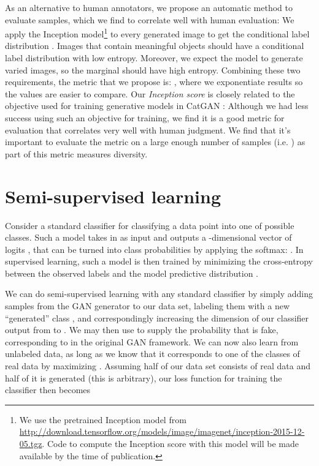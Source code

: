 \documentclass{article} \usepackage{nips14submit_e,times}
\begin{document}
As an alternative to human annotators, we propose an automatic method to evaluate samples, which we find to correlate well with human evaluation: We apply the Inception model\footnote{We use the pretrained Inception model from \url{http://download.tensorflow.org/models/image/imagenet/inception-2015-12-05.tgz}. Code to compute the Inception score with this model will be made available by the time of publication.} \cite{szegedy2015rethinking} to every generated image to get the conditional label distribution . Images that contain meaningful objects should have a conditional label distribution  with low entropy. Moreover, we expect the model to generate varied images, so the marginal  should have high entropy. Combining these two requirements, the metric that we propose is: , where we exponentiate results so the values are easier to compare.
Our {\em Inception score} is closely related to the objective used for training generative models in CatGAN \cite{springenberg2015unsupervised}: Although we had less success using such an objective for training, we find it is a good metric for evaluation that correlates very well with human judgment. We find that it's important to evaluate the metric on a large enough number of samples (i.e. ) as part of this metric measures diversity. 


\section{Semi-supervised learning}
\label{sec:feat_match_experiments}
Consider a standard classifier for classifying a data point  into one of  possible classes. Such a model takes in  as input and outputs a -dimensional vector of logits , that can be turned into class probabilities by applying the softmax: .
In supervised learning, such a model is then trained by minimizing the cross-entropy between the observed labels and the model predictive distribution .

We can do semi-supervised learning with any standard classifier by simply adding
samples from the GAN generator  to our data set, labeling them with a new
``generated'' class , and correspondingly increasing the dimension of
our classifier output from  to .
We may then use  to supply the probability that 
is fake, corresponding to  in the original GAN framework.
We can now also learn from unlabeled data, as long as we know that it corresponds to one of the  classes of real data by maximizing .
Assuming half of our data set consists of real data and half of it is generated (this is arbitrary), our loss function for training the classifier then becomes
\end{document}
